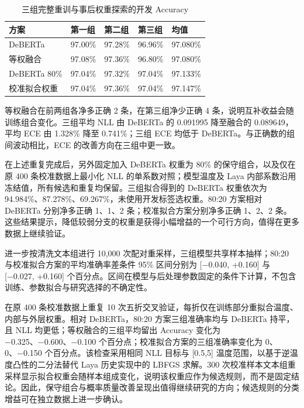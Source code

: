\documentclass[UTF8,fontset=fandol,a4paper,11pt]{ctexart}
\begin{document}
\begin{table}[htbp]\centering\caption{三组完整重训与事后权重探索的开发 Accuracy}\label{tab:t7}\small\renewcommand{\arraystretch}{1.25}
\begin{tabularx}{\linewidth}{YYYYY}\toprule
\textbf{方案} & \textbf{第一组} & \textbf{第二组} & \textbf{第三组} & \textbf{均值}\\\midrule
DeBERTa & 97.00\% & 97.28\% & 96.96\% & 97.080\%\\
等权融合 & 97.08\% & 97.36\% & 96.80\% & 97.080\%\\
DeBERTa 80\% & 97.04\% & 97.32\% & 97.04\% & 97.133\%\\
校准拟合权重 & 97.04\% & 97.36\% & 97.04\% & 97.147\%\\
\bottomrule\end{tabularx}\end{table}
等权融合在前两组各净多正确 2 条，在第三组净少正确 4 条，说明互补收益会随训练组合变化。三组平均 NLL 由 DeBERTa 的 0.091995 降至融合的 0.089649，平均 ECE 由 1.328\% 降至 0.741\%；三组 ECE 均低于 DeBERTa。与正确数的组间波动相比，ECE 的改善方向在三组中更一致。

在上述重复完成后，另外固定加入 DeBERTa 权重为 80\% 的保守组合，以及仅在原 400 条校准数据上最小化 NLL 的单系数对照；模型温度及 Laya 内部系数沿用冻结值，所有候选和重复均保留。三组拟合得到的 DeBERTa 权重依次为 94.984\%、87.278\%、69.267\%，未使用开发标签选权重。80:20 方案相对 DeBERTa 分别净多正确 1、1、2 条；校准拟合方案分别净多正确 1、2、2 条。这些结果提示，降低较弱分支的权重是获得小幅增益的一个可行方向，值得在更多数据上继续验证。

进一步按清洗文本组进行 10,000 次配对重采样，三组模型共享样本抽样；80:20 与校准拟合方案的平均准确率差条件 95\% 区间分别为 [−0.040, +0.160] 与 [−0.027, +0.160] 个百分点。区间在模型与后处理参数固定的条件下计算，不包含训练、参数拟合与研究选择的不确定性。

在原 400 条校准数据上重复 10 次五折交叉验证，每折仅在训练部分重拟合温度、内部与外层权重。相对 DeBERTa，80:20 方案三组准确率均与 DeBERTa 持平，且 NLL 均更低；等权融合的三组平均留出 Accuracy 变化为 −0.325、−0.600、−0.100 个百分点；校准拟合方案的三组准确率变化为 0、0、−0.150 个百分点。该检查采用相同 NLL 目标与 [0.5,5] 温度范围，以基于逆温度凸性的二分法替代 Laya 历史实现中的 LBFGS 求解。300 次校准样本文本组重采样显示拟合权重会随样本组成变化，说明该权重应作为候选规则，而不是固定结论。因此，保守组合与概率质量改善呈现出值得继续研究的方向；候选规则的分类增益可在独立数据上进一步确认。
\end{document}
